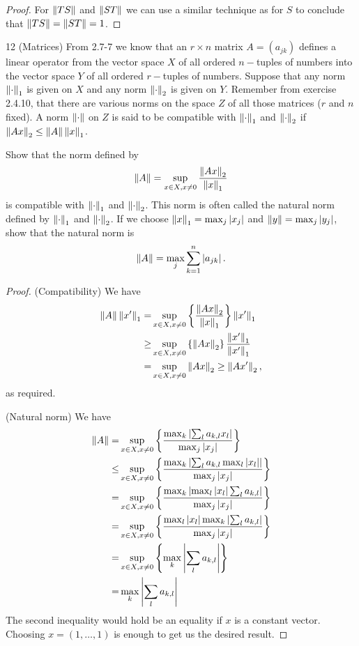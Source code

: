 \begin{proof}
For $\left\lVert TS\right\rVert$ and $\left\lVert ST\right\rVert$ we can use a similar technique as for $S$ to conclude that $\left\lVert TS\right\rVert=\left\lVert ST\right\rVert=1$.

\end{proof}

\begin{exercise}{12 (Matrices)}
From 2.7-7 we know that an $r\times n$ matrix $A=(a_{jk})$ defines a linear operator from the vector space $X$ of all ordered $n-$tuples of numbers into the vector space $Y$ of all ordered $r-$tuples of numbers. 
Suppose that any norm $\left\lVert \cdot\right\rVert_1$ is given on $X$ and any norm $\left\lVert \cdot\right\rVert_2$ is given on $Y$. 
Remember from exercise 2.4.10, that there are various norms on the space $Z$ of all those matrices ($r$ and $n$ fixed). 
A norm $\left\lVert \cdot\right\rVert$ on $Z$ is said to be compatible with $\left\lVert \cdot\right\rVert_1$ and $\left\lVert \cdot\right\rVert_2$ if $\left\lVert Ax\right\rVert_2 \leq\left\lVert A\right\rVert\left\lVert x\right\rVert_1$.

Show that the norm defined by
\[
\left\lVert A\right\rVert = \sup_{x\in X, x\neq 0}\frac{\left\lVert Ax\right\rVert_2}{\left\lVert x\right\rVert_1}
\]
is compatible with $\left\lVert \cdot\right\rVert_1$ and $\left\lVert \cdot\right\rVert_2$. 
This norm is often called the natural norm defined by $\left\lVert \cdot\right\rVert_1$ and $\left\lVert \cdot\right\rVert_2$. 
If we choose $\left\lVert x\right\rVert_1=\max_j\left\lvert x_j\right\rvert$ and $\left\lVert y\right\rVert=\max_j\left\lvert y_j\right\rvert$, show that the natural norm is
\[
\left\lVert A\right\rVert=\max_j\sum^n_{k=1}\left\lvert a_{jk}\right\rvert.
\]
\end{exercise}
\begin{proof}
(Compatibility)
We have 
\begin{align*}
    \left\lVert A\right\rVert\left\lVert x'\right\rVert_1
    =& \sup_{x\in X, x\neq 0}\left\{\frac{\left\lVert Ax\right\rVert_2}{\left\lVert x\right\rVert_1}\right\}\left\lVert x'\right\rVert_1\\
    \geq& \sup_{x\in X, x\neq 0}\left\{\left\lVert Ax\right\rVert_2\right\}\frac{\left\lVert x'\right\rVert_1}{{\left\lVert x'\right\rVert_1}}\\
    =& \sup_{x\in X, x\neq 0}\left\lVert Ax\right\rVert_2
    \geq \left\lVert Ax'\right\rVert_2,
\end{align*}
as required.

(Natural norm)
We have
\begin{align*}
    \left\lVert A\right\rVert
    =& \sup_{x\in X, x\neq 0}\left\{\frac{\max_k \left\lvert \sum_l a_{k,l}x_l\right\rvert}{\max_j \left\lvert x_j\right\rvert}\right\}\\
    \leq& \sup_{x\in X, x\neq 0}\left\{\frac{\max_k \left\lvert \sum_l a_{k,l}\max_l \left\lvert x_l\right\rvert\right\rvert}{\max_j \left\lvert x_j\right\rvert}\right\}\\
    =& \sup_{x\in X, x\neq 0}\left\{\frac{\max_k \left\lvert \max_l \left\lvert x_l\right\rvert\sum_l a_{k,l}\right\rvert}{\max_j \left\lvert x_j\right\rvert}\right\}\\
    =& \sup_{x\in X, x\neq 0}\left\{\frac{\max_l  \left\lvert x_l\right\rvert\max_k\left\lvert \sum_l a_{k,l}\right\rvert}{\max_j \left\lvert x_j\right\rvert}\right\}\\
    =& \sup_{x\in X, x\neq 0}\left\{\max_k\left\lvert \sum_l a_{k,l}\right\rvert\right\}\\
    =& \max_k\left\lvert \sum_l a_{k,l}\right\rvert
\end{align*}
The second inequality would hold be an equality if $x$ is a constant vector.
Choosing $x=(1,\dots,1)$ is enough to get us the desired result.
\end{proof}

